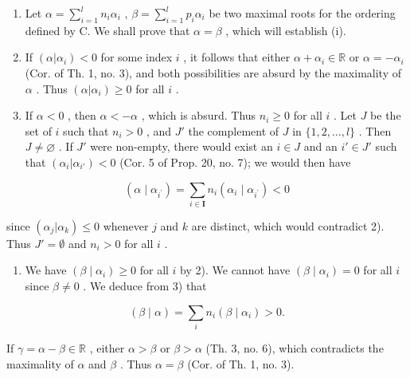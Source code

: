 \begin{enumerate}
\def\labelenumi{\arabic{enumi})}
\item
  Let \(\alpha = \sum_{i=1}^{l} n_i \alpha_i\) , \(\beta = \sum_{i=1}^{l} p_i \alpha_i\) be two maximal roots for the ordering defined by C. We shall prove that \(\alpha = \beta\) , which will establish (i).
\item
  If \((\alpha | \alpha_i) < 0\) for some index \(i\) , it follows that either \(\alpha + \alpha_i \in \mathbb{R}\) or \(\alpha = -\alpha_i\) (Cor. of Th. 1, no. 3), and both possibilities are absurd by the maximality of \(\alpha\) . Thus \((\alpha | \alpha_i) \geqslant 0\) for all \(i\) .
\item
  If \(\alpha < 0\) , then \(\alpha < -\alpha\) , which is absurd. Thus \(n_i \geqslant 0\) for all \(i\) . Let \(J\) be the set of \(i\) such that \(n_i > 0\) , and \(J'\) the complement of \(J\) in \(\{1, 2, \ldots, l\}\) . Then \(J \neq \varnothing\) . If \(J'\) were non-empty, there would exist an \(i \in J\) and an \(i' \in J'\) such that \((\alpha_i | \alpha_{i'}) < 0\) (Cor. 5 of Prop. 20, no. 7); we would then have
\end{enumerate}

\[
\left(\alpha \mid \alpha_ {i ^ {\prime}}\right) = \sum_ {i \in \mathbf {I}} n _ {i} \left(\alpha_ {i} \mid \alpha_ {i ^ {\prime}}\right) <   0
\]

since \((\alpha_{j}|\alpha_{k})\leqslant 0\) whenever \(j\) and \(k\) are distinct, which would contradict 2). Thus \(J' = \emptyset\) and \(n_i > 0\) for all \(i\) .

\begin{enumerate}
\def\labelenumi{\arabic{enumi})}
\setcounter{enumi}{3}
\tightlist
\item
  We have \((\beta \mid \alpha_i) \geqslant 0\) for all \(i\) by 2). We cannot have \((\beta \mid \alpha_i) = 0\) for all \(i\) since \(\beta \neq 0\) . We deduce from 3) that
\end{enumerate}

\[
(\beta \mid \alpha) = \sum_ {i} n _ {i} (\beta \mid \alpha_ {i}) > 0.
\]

If \(\gamma = \alpha - \beta \in \mathbb{R}\) , either \(\alpha > \beta\) or \(\beta > \alpha\) (Th. 3, no. 6), which contradicts the maximality of \(\alpha\) and \(\beta\) . Thus \(\alpha = \beta\) (Cor. of Th. 1, no. 3).

